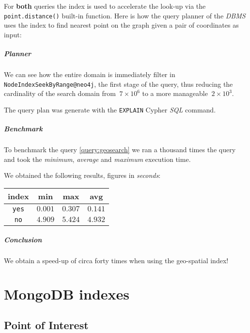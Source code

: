 For \textbf{both} queries the index is used to accelerate the look-up via the 
\texttt{point.distance()} built-in function. Here is how the query planner of 
the \textit{DBMS} uses the index to find nearest point on the graph given a 
pair of coordinates as input:

\paragraph{Planner}
We can see how the entire domain is immediately filter in 
\texttt{NodeIndexSeekByRange@neo4j}, the first stage of the query, thus 
reducing the cardinality of the 
search domain from $~7 \times 10^6$ to a more manageable $~ 2 \times 10^3$.

The query plan was generate with the \texttt{EXPLAIN} Cypher \textit{SQL 
}command.




\paragraph{Benchmark}
To benchmark the query \ref{query:geosearch} we ran a thousand times the query
and took the \textit{minimum}, \textit{average} and \textit{maximum} execution
time.



We obtained the following results, figures in \textit{seconds}:

\begin{tabular}{|c|c|c|c|}
	\hline
	index & min & max & avg \\
	\hline
	\hline
	\texttt{yes} & $0.001$ & $0.307$ & $0.141$  \\
	\hline
	\texttt{no} & $4.909$ & $5.424$ & $4.932$  \\
	\hline
\end{tabular}

\paragraph{Conclusion}
We obtain a speed-up of circa forty times when using the geo-spatial index!

\chapter{MongoDB indexes}

\section{Point of Interest}

